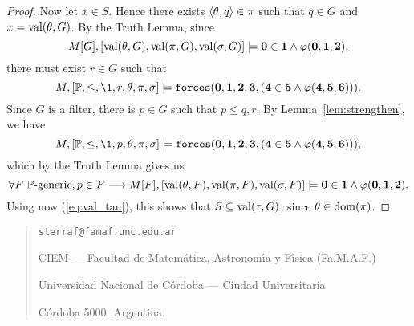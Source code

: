 \documentclass[11pt,english]{article}
\renewcommand{\PP}{\mathbb{P}}
\newcommand{\forceisa}{\mathtt{forces}}
\newcommand{\dB}[1]{\mathbf{#1}}
\DeclareMathOperator{\val}{val}
\begin{document}
\begin{proof}
  Now let $x\in S$. Hence there exists $\langle\theta,q\rangle\in\pi$ such that
  $q\in G$ and $x=\val(\th,G)$. By the  Truth
  Lemma, since 
  \[
  M[G],[\val(\th,G),\val(\pi,G),\val(\sig,G)]\models
  \dB{0}\in\dB{1}\y\phi(\dB{0},\dB{1},\dB{2}),
  \]
  there must exist $r\in G$ such that 
  \[
  M,[\PP,\leq,\1,r,\th,\pi,\sig]\models
  \forceisa(\dB{0},\dB{1},\dB{2},\dB{3},
  (\dB{4}\in\dB{5}\y\phi(\dB{4},\dB{5},\dB{6}))).
  \]
  Since $G$ is a filter, there is $p\in G$ such that $p\leq q, r$.
  By Lemma~\ref{lem:strengthen}, we have
  \[
  M,[\PP,\leq,\1,p,\th,\pi,\sig]\models
  \forceisa(\dB{0},\dB{1},\dB{2},\dB{3},
  (\dB{4}\in\dB{5}\y \phi(\dB{4},\dB{5},\dB{6}))),
  \]
  which by the Truth Lemma gives us
  \[
  \forall F\ \PP\text{-generic}, \\
   p\in F \longrightarrow
  M[F],[\val(\th,F),\val(\pi,F),\val(\sig,F)]\models
  \dB{0}\in \dB{1} \y\phi(\dB{0},\dB{1},\dB{2}).
  \]
  Using now (\ref{eq:val_tau}), this shows that $S\sbq \val(\tau,G)$,
  since $\theta\in\operatorname{dom}(\pi)$. 
\end{proof}





\bigskip

\begin{small}
  \begin{quote}
    \texttt{sterraf@famaf.unc.edu.ar}
    
    CIEM --- Facultad de Matem\'atica, Astronom\'{\i}a y F\'{\i}sica 
    (Fa.M.A.F.) 
    
    Universidad Nacional de C\'ordoba --- Ciudad Universitaria
    
    C\'ordoba 5000. Argentina.
  \end{quote}
\end{small}
\end{document}
